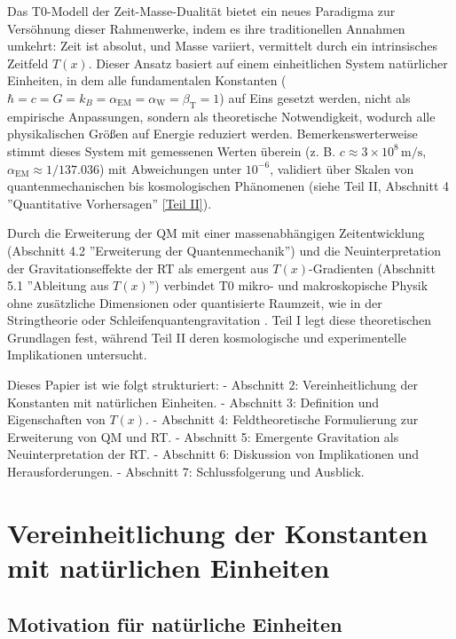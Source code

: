 \documentclass[12pt,a4paper]{article}
\newcommand{\Tfield}{T(x)}
\newcommand{\alphaEM}{\alpha_{\text{EM}}}
\newcommand{\alphaW}{\alpha_{\text{W}}}
\newcommand{\betaT}{\beta_{\text{T}}}
\begin{document}
	Das T0-Modell der Zeit-Masse-Dualität bietet ein neues Paradigma zur Versöhnung dieser Rahmenwerke, indem es ihre traditionellen Annahmen umkehrt: Zeit ist absolut, und Masse variiert, vermittelt durch ein intrinsisches Zeitfeld \(\Tfield\). Dieser Ansatz basiert auf einem einheitlichen System natürlicher Einheiten, in dem alle fundamentalen Konstanten (\(\hbar = c = G = k_B = \alphaEM = \alphaW = \betaT = 1\)) auf Eins gesetzt werden, nicht als empirische Anpassungen, sondern als theoretische Notwendigkeit, wodurch alle physikalischen Größen auf Energie reduziert werden. Bemerkenswerterweise stimmt dieses System mit gemessenen Werten überein (z. B. \(c \approx 3 \times 10^8 \, \text{m/s}\), \(\alphaEM \approx 1/137.036\)) mit Abweichungen unter \(10^{-6}\), validiert über Skalen von quantenmechanischen bis kosmologischen Phänomenen (siehe Teil II, Abschnitt 4 ''Quantitative Vorhersagen'' \href{https://github.com/jpascher/T0-Time-Mass-Duality/tree/main/2/pdf/Deutsch/Bridging Quantum Mechanics and Relativity through Time-Mass Duality Part II Theoretical Foundations.pdf}{[Teil II]}).
	
	Durch die Erweiterung der QM mit einer massenabhängigen Zeitentwicklung (Abschnitt 4.2 ''Erweiterung der Quantenmechanik'') und die Neuinterpretation der Gravitationseffekte der RT als emergent aus \(\Tfield\)-Gradienten (Abschnitt 5.1 ''Ableitung aus \(\Tfield\)'') verbindet T0 mikro- und makroskopische Physik ohne zusätzliche Dimensionen oder quantisierte Raumzeit, wie in der Stringtheorie oder Schleifenquantengravitation \cite{Greene2020,tHooft1993}. Teil I legt diese theoretischen Grundlagen fest, während Teil II deren kosmologische und experimentelle Implikationen untersucht.
	
	Dieses Papier ist wie folgt strukturiert:
	- Abschnitt 2: Vereinheitlichung der Konstanten mit natürlichen Einheiten.
	- Abschnitt 3: Definition und Eigenschaften von \(\Tfield\).
	- Abschnitt 4: Feldtheoretische Formulierung zur Erweiterung von QM und RT.
	- Abschnitt 5: Emergente Gravitation als Neuinterpretation der RT.
	- Abschnitt 6: Diskussion von Implikationen und Herausforderungen.
	- Abschnitt 7: Schlussfolgerung und Ausblick.
	
	\section{Vereinheitlichung der Konstanten mit natürlichen Einheiten}
	\label{sec:unified_units}
	
	\subsection{Motivation für natürliche Einheiten}
	\label{subsec:motivation_units}
	
\end{document}
